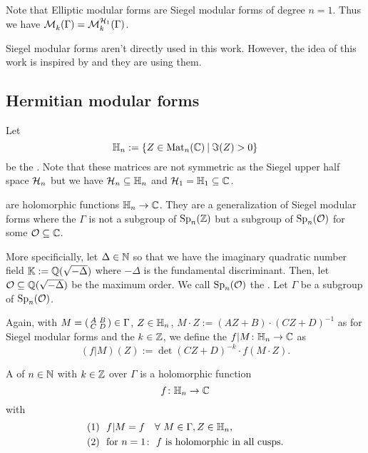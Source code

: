 Note that Elliptic modular forms are Siegel modular forms of degree $n=1$. Thus we have $\operatorname{\mathcal{M}}^{}_k (\Gamma) = \operatorname{\mathcal{M}}^{\mathcal{H}_{1}}_k (\Gamma)$.

Siegel modular forms aren't directly used in this work. However, the idea of this work is inspired by \cite{PoorYuen07Comp} and they are using them.


\subsection{Hermitian modular forms}

Let
\[ \HalfPlane_n :=  \Set{ Z \in \M_n(\C) }{ \Im(Z) > 0} \]
be the . Note that these matrices are not symmetric as the Siegel upper half space $\mathcal{H}_n$ but we have $\mathcal{H}_n \subseteq \mathbb{H}_n$ and $\mathcal{H}_1 = \mathbb{H}_1 \subseteq \mathbb{C}$.

 are holomorphic functions $\mathbb{H}_n \rightarrow \mathbb{C}$. They are a generalization of Siegel modular forms where the  $\Gamma$ is not a subgroup of $\operatorname{Sp}_n(\mathbb{Z})$ but a subgroup of $\operatorname{Sp}_n(\mathcal{O})$ for some $\mathcal{O} \subseteq \mathbb{C}$.


More specificially,
let $\Delta \in \mathbb{N}$ so that we have the imaginary quadratic number field $\mathbb{K} := \mathbb{Q}(\sqrt{-\Delta})$ where $-\Delta$ is the fundamental discriminant.
Then, let $\mathcal{O} \subseteq \mathbb{Q}(\sqrt{-\Delta})$ be the maximum order.
We call $\operatorname{Sp}_n(\mathcal{O})$ the .
Let $\Gamma$ be a subgroup of $\operatorname{Sp}_n(\mathcal{O})$.

Again, with $M = \left( \begin{smallmatrix} A & B \\ C & D \end{smallmatrix} \right) \in \Gamma$, $Z \in \mathbb{H}_n$, $M \cdot Z := (A Z + B) \cdot (C Z + D)^{-1}$ as for Siegel modular forms and the  $k \in \mathbb{Z}$, we define the  $f | M \colon \mathbb{H}_n \rightarrow \mathbb{C}$ as
\[ (f|M) (Z) := \det(CZ + D)^{-k} \cdot f(M \cdot Z) .\]

A 
of  $n\in\mathbb{N}$
with  $k\in \mathbb{Z}$
over $\Gamma$
is a holomorphic function
\[ f \colon \mathbb{H}_n \rightarrow \mathbb{C} \]
with
\begin{align*}
(1) \ \ & f | M = f \quad\forall\ M \in \Gamma, Z \in \mathbb{H}_n , \\
(2) \ \ & \text{for } n = 1 \colon \ \text{$f$ is holomorphic in all cusps} .
\end{align*}

